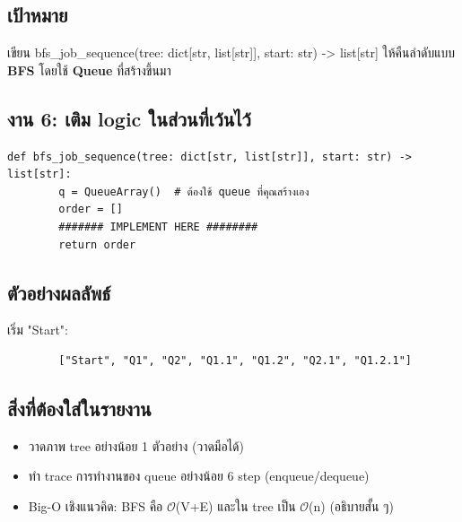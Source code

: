 \documentclass[12pt,a4paper]{article}
\newcommand{\bigO}{\ensuremath{\mathcal{O}}}
\begin{document}
	\subsection*{เป้าหมาย}
	เขียน {bfs\_job\_sequence(tree: dict[str, list[str]], start: str) -> list[str]}
	ให้คืนลำดับแบบ \textbf{BFS} โดยใช้ \textbf{Queue} ที่สร้างขึ้นมา
	
	\subsection*{งาน 6: เติม logic ในส่วนที่เว้นไว้}
	\begin{lstlisting}[style=py]
	def bfs_job_sequence(tree: dict[str, list[str]], start: str) -> list[str]:
		q = QueueArray()  # ต้องใช้ queue ที่คุณสร้างเอง
		order = []
		####### IMPLEMENT HERE ########
		return order
	\end{lstlisting}
	
	\subsection*{ตัวอย่างผลลัพธ์}
	เริ่ม {"Start"}:
	\begin{verbatim}
		["Start", "Q1", "Q2", "Q1.1", "Q1.2", "Q2.1", "Q1.2.1"]
	\end{verbatim}
	
	\subsection*{สิ่งที่ต้องใส่ในรายงาน}
	\begin{itemize}
		\item วาดภาพ tree อย่างน้อย 1 ตัวอย่าง (วาดมือได้)
		\item ทำ trace การทำงานของ queue อย่างน้อย 6 step (enqueue/dequeue)
		\item Big-O เชิงแนวคิด: BFS คือ \bigO(V+E) และใน tree เป็น \bigO(n) (อธิบายสั้น ๆ)
	\end{itemize}
	
\end{document}
